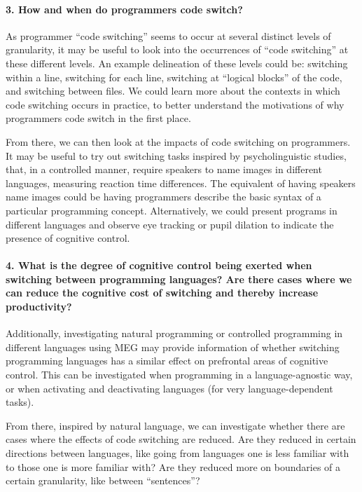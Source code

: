 \documentclass[a4paper,UKenglish,cleveref, autoref]{oasics-v2019}
\begin{document}
\paragraph*{3. How and when do programmers code switch?}

As programmer “code switching” seems to occur at several distinct levels of granularity, it may be useful to look into the occurrences of “code switching” at these different levels. An example delineation of these levels could be: switching within a line, switching for each line, switching at “logical blocks” of the code, and switching between files. We could learn more about the contexts in which code switching occurs in practice, to better understand the motivations of why programmers code switch in the first place. 

From there, we can then look at the impacts of code switching on programmers. It may be useful to try out switching tasks inspired by psycholinguistic studies, that, in a controlled manner, require speakers to name images in different languages, measuring reaction time differences. The equivalent of having speakers name images could be having programmers describe the basic syntax of a particular programming concept. Alternatively, we could present programs in different languages and observe eye tracking or pupil dilation to indicate the presence of cognitive control. 
\paragraph*{4. What is the degree of cognitive control being exerted when switching between programming languages? Are there cases where we can reduce the cognitive cost of switching and thereby increase productivity?}

Additionally, investigating natural programming or controlled programming in different languages using MEG may provide information of whether switching programming languages has a similar effect on prefrontal areas of cognitive control. This can be investigated when programming in a language-agnostic way, or when activating and deactivating languages (for very language-dependent tasks). 
 
From there, inspired by natural language, we can investigate whether there are cases where the effects of code switching are reduced. Are they reduced in certain directions between languages, like going from languages one is less familiar with to those one is more familiar with? Are they reduced more on boundaries of a certain granularity, like between “sentences”?
\end{document}

